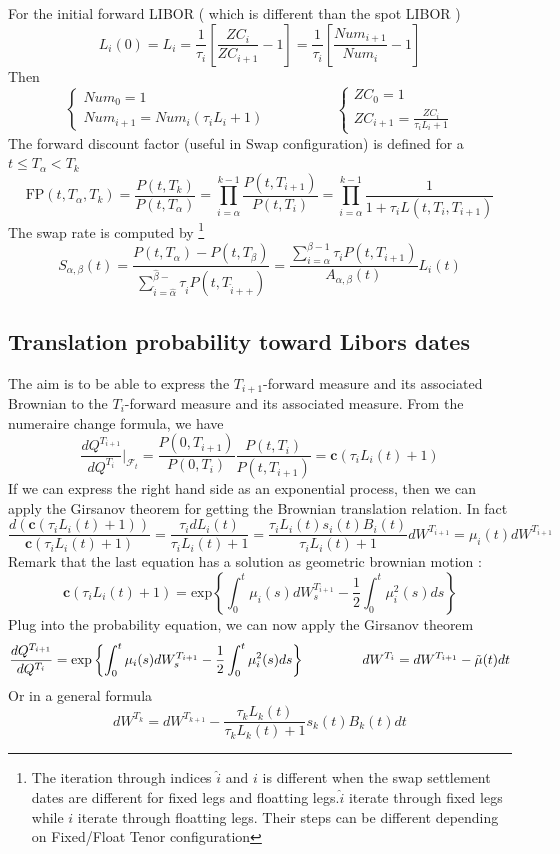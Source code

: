 \documentclass[a4paper,10pt]{article}
\newcommand{\Ti}{T_{i}}
\newcommand{\Ta}{T_{\alpha}}
\newcommand{\Tii}{T_{i+1}}
\newcommand{\Pti}{P(t,T_{i})}
\newcommand{\Ptii}{P(t,T_{i+1})}
\newcommand{\Lti}{L(t,\Ti,\Tii)}
\newcommand{\Lit}{L_{i}(t)}
\newcommand{\ZCi}{ZC_{i}}
\newcommand{\ZCii}{ZC_{i+1}}
\newcommand{\Numi}{Num_{i}}
\newcommand{\Numii}{Num_{i+1}}
\begin{document}
For the initial forward LIBOR ( which is different than the spot LIBOR )
\[
L_i(0) = L_i = \frac{1}{\tau_i} \left[ \frac{\ZCi}{\ZCii} - 1  \right] = \frac{1}{\tau_i} \left[ \frac{\Numii}{\Numi} - 1  \right]
\]
Then
\[
\left\{
\begin{array}{l}
Num_0 = 1 \\
\Numii = \Numi(\tau_i L_i +1)
\end{array}
\right.
\hspace{2cm}
\left\{
\begin{array}{l}
ZC_0 = 1 \\
\ZCii = \frac{\ZCi}{\tau_i L_i +1}
\end{array}
\right.
\]
The forward discount factor (useful in Swap configuration) is defined for a $t\leq \Ta < T_k$
\[
\text{FP}(t,\Ta,T_k)= \frac{P(t,T_k)}{P(t,\Ta)}
 = \prod^{k-1}_{i=\alpha} \frac{\Ptii}{\Pti} 
 = \prod^{k-1}_{i=\alpha} \frac{1}{1+\tau_i \Lti }
\]
The swap rate is computed by \footnote{The iteration through indices $\hat{i}$ and $i$ is different when the swap settlement dates are different for fixed legs and floatting legs.$\hat{i}$ iterate through fixed legs while $i$ iterate through floatting legs. Their steps can be different depending on Fixed/Float Tenor configuration}
\[
S_{\alpha,\beta}(t) 
= 
\frac{P(t,T_{\alpha})-P(t,T_{\beta})}{\sum^{\hat{\beta}-}_{\hat{i}=\hat{\alpha}}\tau_{\hat{i}}P(t,T_{\hat{i}++})} 
=
\frac{\sum^{\beta-1}_{i=\alpha} \tau_i \Ptii }{A_{\alpha,\beta}(t)} \Lit 
\]
\subsection{Translation probability toward Libors dates}
The aim is to be able to express the $\Tii$-forward measure and its associated Brownian to the $\Ti$-forward measure and its associated measure. From the numeraire change formula, we have
\[
\frac{dQ^{\Tii}}{dQ^{\Ti}}|_{\mathcal{F}_t} = \frac{P(0,\Tii)}{P(0,\Ti)}\frac{\Pti}{\Ptii} = \textbf{c} (\tau_i \Lit + 1 )
\]
If we can express the right hand side as an exponential process, then we can apply the Girsanov theorem for getting the Brownian translation relation. In fact
\[
\frac{d (\textbf{c} (\tau_i \Lit + 1 )) }{\textbf{c} (\tau_i \Lit + 1 )} 
= \frac{\tau_i d\Lit }{\tau_i \Lit +1} = \frac{\tau_i \Lit s_i(t) B_i(t) }{\tau_i \Lit +1} dW^{\Tii} = \mu_i(t)dW^{\Tii}
\]
Remark that the last equation has a solution as geometric brownian motion :
\[
\textbf{c} (\tau_i \Lit + 1 ) = \text{exp} \left\{ \int_0^t \mu_i(s)dW^{\Tii}_s - \frac{1}{2}\int_0^t \mu^2_i(s)ds \right\}
\]
Plug into the probability equation, we can now apply the Girsanov theorem
\[
\frac{dQ^{\Tii}}{dQ^{\Ti}} = \text{exp} \left\{ \int_0^t \mu_i(s)dW^{\Tii}_s - \frac{1}{2}\int_0^t \mu^2_i(s)ds \right\}
\hspace{1.5cm}
dW^{\Ti} = dW^{\Tii} - \tilde{\mu}(t)dt
\]
Or in a general formula
\[
dW^{T_{k}} = dW^{T_{k+1}} - \frac{\tau_k L_k(t)}{\tau_k L_k(t) +1}  s_k(t) B_k(t) dt
\]
\end{document}
